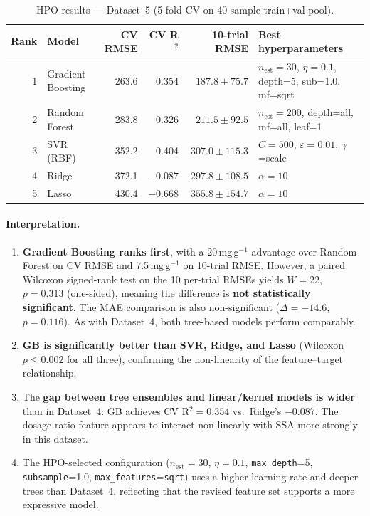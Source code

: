 \documentclass[12pt,a4paper]{article}
\begin{document}
\begin{table}[h]
\centering
\caption{HPO results — Dataset~5 (5-fold CV on 40-sample train+val pool).}
\label{tab:ds5_hpo}
\small
\begin{tabular}{rlrrrp{5cm}}
\toprule
Rank & Model & CV RMSE & CV R$^2$ & 10-trial RMSE & Best hyperparameters \\
\midrule
1 & Gradient Boosting & 263.6 & 0.354 & $187.8 \pm 75.7$ &
  $n_\text{est}=30$, $\eta=0.1$, depth=5, sub=1.0, mf=sqrt \\
2 & Random Forest & 283.8 & 0.326 & $211.5 \pm 92.5$ &
  $n_\text{est}=200$, depth=all, mf=all, leaf=1 \\
3 & SVR (RBF) & 352.2 & 0.404 & $307.0 \pm 115.3$ &
  $C=500$, $\varepsilon=0.01$, $\gamma$=scale \\
4 & Ridge & 372.1 & $-0.087$ & $297.8 \pm 108.5$ &
  $\alpha=10$ \\
5 & Lasso & 430.4 & $-0.668$ & $355.8 \pm 154.7$ &
  $\alpha=10$ \\
\bottomrule
\end{tabular}
\end{table}

\paragraph{Interpretation.}
\begin{enumerate}[leftmargin=*]
  \item \textbf{Gradient Boosting ranks first}, with a
        20\,mg\,g$^{-1}$ advantage over Random Forest on CV RMSE and
        7.5\,mg\,g$^{-1}$ on 10-trial RMSE.
        However, a paired Wilcoxon signed-rank test on the 10 per-trial
        RMSEs yields $W=22$, $p=0.313$ (one-sided), meaning the
        difference is \textbf{not statistically significant}.  The MAE
        comparison is also non-significant ($\Delta = -14.6$, $p = 0.116$).
        As with Dataset~4, both tree-based models perform comparably.
  \item \textbf{GB is significantly better than SVR, Ridge, and Lasso}
        (Wilcoxon $p \leq 0.002$ for all three), confirming the
        non-linearity of the feature--target relationship.
  \item The \textbf{gap between tree ensembles and linear/kernel models
        is wider} than in Dataset~4: GB achieves CV R$^2 = 0.354$ vs.\
        Ridge's $-0.087$.  The dosage ratio feature appears to interact
        non-linearly with SSA more strongly in this dataset.
  \item The HPO-selected configuration
        ($n_\text{est}=30$, $\eta=0.1$, \texttt{max\_depth}=5,
        \texttt{subsample}=1.0, \texttt{max\_features}=\texttt{sqrt})
        uses a higher learning rate and deeper trees than Dataset~4,
        reflecting that the revised feature set supports a more
        expressive model.
\end{enumerate}
\end{document}
